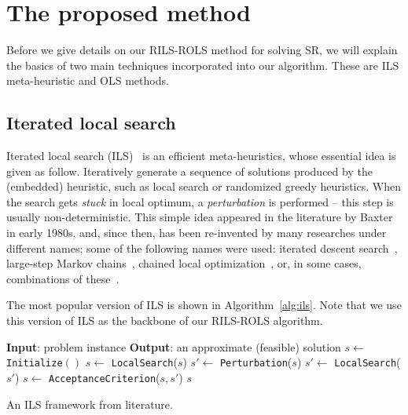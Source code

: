 \documentclass[a4paper,12pt]{elsarticle}
\begin{document}


\section{The proposed method}\label{sec:rils}
   Before we give details on our RILS-ROLS method for solving SR, we will explain the basics of two main techniques incorporated into our algorithm. These are ILS meta-heuristic and OLS methods. 
   
  \subsection{Iterated local search}
    Iterated local search (ILS)~\cite{lourencco2003iterated} is an efficient meta-heuristics, whose essential idea is given as follow. Iteratively generate a sequence of solutions produced by the (embedded) heuristic, such as local search or randomized greedy heuristics. When the search gets \emph{stuck} in local optimum, a \emph{perturbation} is performed -- this step is usually non-deterministic. This simple idea appeared in the literature by Baxter~\cite{baxter1981local} in early 1980s, and, since then, has been  re-invented by many researches under different names; some of the following names were used: iterated descent search~\cite{baum1998iterated}, large-step
    Markov chains~\cite{martin1991large}, chained local optimization~\cite{martin1996combining}, or, in some cases, combinations of these~\cite{applegate2003chained}. 
  
   The most popular version of ILS is shown in Algorithm~\ref{alg:ils}. Note that we use this version of ILS as the backbone of our RILS-ROLS algorithm.
   
   \begin{algorithm}
  		\begin{algorithmic}[1] 
  			 \State \textbf{Input}: problem instance
  	 		\State \textbf{Output}: an approximate (feasible) solution 
  	 		\State $s \gets$ \texttt{Initialize}$()$
  	 		\State  $s \gets$ \texttt{LocalSearch}($s$)
   	    		 \State  $s' \gets$ \texttt{Perturbation}($s$)
   	    		 \State  $s' \gets$ \texttt{LocalSearch}($s'$)
   	    		 \State  $ s \gets$ \texttt{AcceptanceCriterion}($s, s'$)
   	 		\EndWhile
   	 		\State \Return $s$
   		\end{algorithmic}
    	\caption{An ILS framework from   literature.}
    	   	     \label{alg:ils}
    \end{algorithm}  
   
\end{document}
